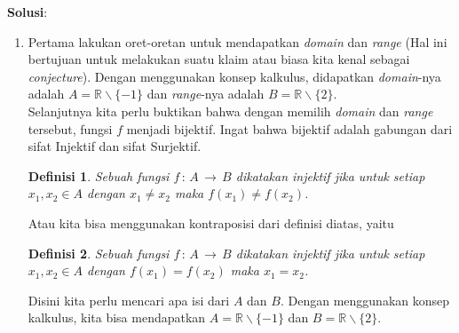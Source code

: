 \documentclass[10pt,openany,a4paper]{article}
\newcommand{\R}{\mathbb{R}}
\newcommand{\jawab}{\textbf{Solusi}:}
\newtheorem*{definisi}{Definisi}
\begin{document}
\newpage
\fancyfoot[C]{}
\jawab
\begin{enumerate}
    \item Pertama lakukan oret-oretan untuk mendapatkan \textit{domain} dan \textit{range} (Hal ini bertujuan untuk melakukan suatu klaim atau biasa kita kenal sebagai \textit{conjecture}). Dengan menggunakan konsep kalkulus, didapatkan \textit{domain}-nya adalah $A=\R\backslash\{-1\}$ dan \textit{range}-nya adalah $B=\R\backslash\{2\}$.\\

          Selanjutnya kita perlu buktikan bahwa dengan memilih \textit{domain} dan \textit{range} tersebut, fungsi $f$ menjadi bijektif. Ingat bahwa bijektif adalah gabungan dari sifat Injektif dan sifat Surjektif.\\

          \begin{definisi}
              Sebuah fungsi $f\,:\,A\,\to\,B$ dikatakan injektif jika untuk setiap $x_1,x_2\in A$ dengan $x_1\ne x_2$ maka $f(x_1)\ne f(x_2)$.
          \end{definisi}
          Atau kita bisa menggunakan kontraposisi dari definisi diatas, yaitu
          \begin{definisi}
              Sebuah fungsi $f\,:\,A\,\to\,B$ dikatakan injektif jika untuk setiap $x_1,x_2\in A$ dengan $f(x_1)=f(x_2)$ maka $x_1=x_2$.
          \end{definisi}
          Disini kita perlu mencari apa isi dari $A$ dan $B$. Dengan menggunakan konsep kalkulus, kita bisa mendapatkan $A=\R\backslash\{-1\}$ dan $B=\R\backslash\{2\}$.


\end{enumerate}
\end{document}

